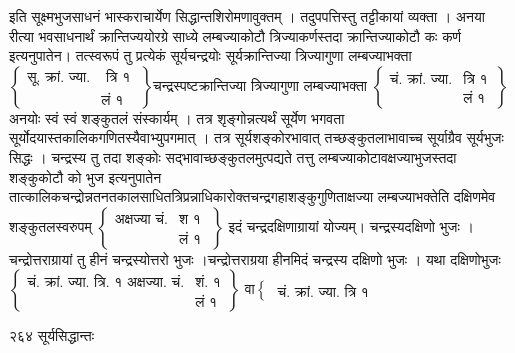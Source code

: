 \documentclass[11pt, openany]{book}
\begin{document}
 इति सूक्ष्मभुजसाधनं भास्कराचार्येण सिद्धान्तशिरोमणावुक्तम् । तदुपपत्तिस्तु तट्टीकायां व्यक्ता । अनया रीत्या भवसाधनार्थं क्रान्तिज्ययोरग्रे साध्ये लम्बज्याकोटौ त्रिज्याकर्णस्तदा क्रान्तिज्याकोटौ कः कर्ण इत्यनुपातेन। तत्स्वरूपं तु प्रत्येकं सूर्यचन्द्रयोः सूर्यक्रान्तिज्या त्रिज्यागुणा लम्बज्याभक्ता $\left\{
\begin{array}{lr}\mbox{
सू. क्रां. ज्या.}
&\mbox{ त्रि १ }\\
& \mbox{लं १ }
\end{array}
\right\}$चन्द्रस्पष्टक्रान्तिज्या त्रिज्यागुणा लम्बज्याभक्ता $\left\{
\begin{array}{lr}\mbox{
चं. क्रां.
ज्या.}& \mbox{त्रि १} \\
 & \mbox{लं १ }
\end{array}
\right\}$अनयोः स्वं स्वं शङ्कुतलं संस्कार्यम् । तत्र शृङ्गोन्नत्यर्थं सूर्येण भगवता सूर्योदयास्तकालिकगणितस्यैवाभ्युपगमात् । तत्र सूर्यशङ्कोरभावात् तच्छङ्कुतलाभावाच्च सूर्याग्रैव सूर्यभुजः सिद्धः । चन्द्रस्य तु तदा शङ्कोः सद्भावाच्छङ्कुतलमुत्पद्यते तत्तु लम्बज्याकोटावक्षज्याभुजस्तदा शङ्कुकोटौ को भुज इत्यनुपातेन तात्कालिकचन्द्रोन्नतनतकालसाधितत्रिप्रन्नाधिकारोक्तचन्द्रगहाशङ्कुगुणिताक्षज्या लम्बज्याभक्तेति दक्षिणमेव शङ्कुतलस्वरुपम् $\left\{
\begin{array}{lr}\mbox{
अक्षज्या चं.} & \mbox{श १} \\ 
& \mbox{लं १ }
\end{array}
\right\}$ इदं चन्द्रदक्षिणाग्रायां योज्यम्। चन्द्रस्यदक्षिणो भुजः । चन्द्रोत्तराग्रायां तु हीनं चन्द्रस्योत्तरो भुजः ।चन्द्रोत्तराग्रया हीनमिदं चन्द्रस्य दक्षिणो भुजः । यथा दक्षिणोभुजः $\left\{
\begin{array}{lr}\mbox{
 चं. क्रां. ज्या. त्रि. १ अक्षज्या. चं.} & \mbox{शं. १} \\
 & \mbox{लं १ }
 \end{array}
\right\}$ वा$ \begin{cases}
\mbox{ चं. क्रां. ज्या. त्रि १}
\end{cases}
$


\newpage


\noindent २६४ \hspace{4cm} सूर्यसिद्धान्तः
\vspace{1cm}
\end{document}
